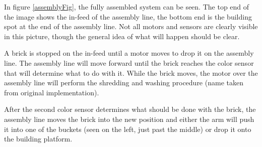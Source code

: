 \documentclass[conference]{IEEEtran}
\begin{document}
In figure \ref{assemblyFig}, the fully assembled system can be seen. The top end of the image shows the in-feed of the assembly line, the bottom end is the building spot at the end of the assembly line. Not all motors and sensors are clearly visible in this picture, though the general idea of what will happen should be clear.

A brick is stopped on the in-feed until a motor moves to drop it on the assembly line. The assembly line will move forward until the brick reaches the color sensor that will determine what to do with it. While the brick moves, the motor over the assembly line will perform the shredding and washing procedure (name taken from original implementation). 

After the second color sensor determines what should be done with the brick, the assembly line moves the brick into the new position and either the arm will push it into one of the buckets (seen on the left, just past the middle) or drop it onto the building platform. 
\end{document}
